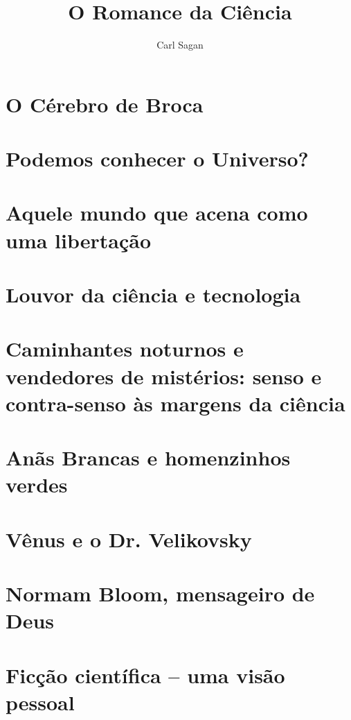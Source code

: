 \documentclass[12pt]{memoir}
\title{O Romance da Ciência}
\author{Carl Sagan}
\date {}
\begin{document}
\maketitle
\newpage



\tableofcontents 
\chapter{O Cérebro de Broca}
\setcounter{page}{17} %
\chapter{Podemos conhecer o Universo?}
\setcounter{page}{27}
\chapter{Aquele mundo que acena como uma libertação}
\setcounter{page}{33}
\chapter{Louvor da ciência e tecnologia}
\setcounter{page}{46}
\chapter{Caminhantes noturnos e vendedores de mistérios: senso e contra-senso às margens da ciência} 
\setcounter{page}{57}
\chapter{Anãs Brancas e homenzinhos verdes}
\setcounter{page}{81}
\chapter{Vênus e o Dr. Velikovsky}
\setcounter{page}{96}
\chapter{Normam Bloom, mensageiro de Deus}
\setcounter{page}{144}
\chapter{Ficção científica -- uma visão pessoal}
\setcounter{page}{153}
\end{document}
